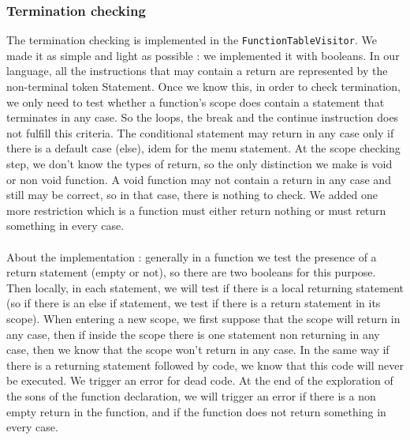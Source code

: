 \documentclass[a4paper,11pt]{article}
\begin{document}
\subsubsection{Termination checking}
The termination checking is implemented in the \texttt{FunctionTableVisitor}. We made it as simple and light as possible : we implemented it with booleans. In our language, all the instructions that may contain a return are represented by the non-terminal token Statement. Once we know this, in order to check termination, we only need to test whether a function's scope does contain a statement that terminates in any case. So the loops, the break and the continue instruction does not fulfill this criteria. The conditional statement may return in any case only if there is a default case (else), idem for the menu statement. At the scope checking step, we don't know the types of return, so the only distinction we make is void or non void function. A void function may not contain a return in any case and still may be correct, so in that case, there is nothing to check. We added one more restriction which is a function must either return nothing or must return something in every case.
\paragraph{}
About the implementation : generally in a function we test the presence of a return statement (empty or not), so there are two booleans for this purpose. Then locally, in each statement, we will test if there is a local returning statement (so if there is an else if statement, we test if there is a return statement in its scope). When entering a new scope, we first suppose that the scope will return in any case, then if inside the scope there is one statement non returning in any case, then we know that the scope won't return in any case. In the same way if there is a returning statement followed by code, we know that this code will never be executed. We trigger an error for dead code.  At the end of the exploration of the sons of the function declaration, we will trigger an error if there is a non empty return in the function, and if the function does not return something in every case.
\end{document}
